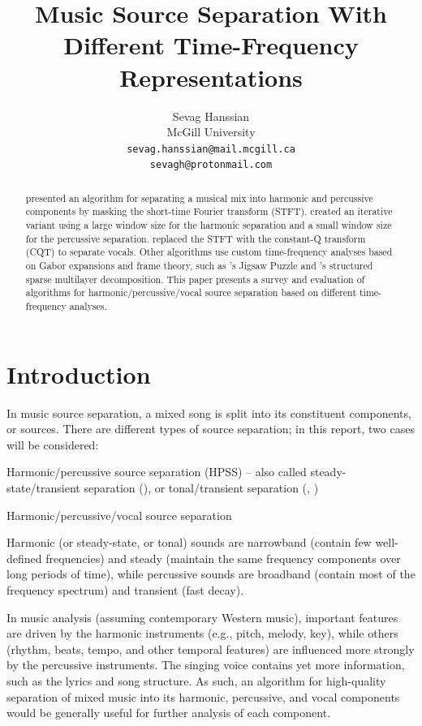 \documentclass[10pt,letter]{article}
\title{Music Source Separation With Different Time-Frequency Representations}
\author{Sevag Hanssian \\
  McGill University \\
 \texttt{sevag.hanssian@mail.mcgill.ca} \\
 \texttt{sevagh@protonmail.com}}
\date{}
\newenvironment{tight_enumerate}{
\begin{enumerate}
\setlength{\itemsep}{0pt}
\setlength{\parskip}{0pt}
}{\end{enumerate}}
\begin{document}
\maketitle

\begin{abstract}
	\citet{fitzgerald1} presented an algorithm for separating a musical mix into harmonic and percussive components by masking the short-time Fourier transform (STFT). \citet{driedger} created an iterative variant using a large window size for the harmonic separation and a small window size for the percussive separation. \citet{fitzgerald2} replaced the STFT with the constant-Q transform (CQT) to separate vocals. Other algorithms use custom time-frequency analyses based on Gabor expansions and frame theory, such as \citet{tfjigsaw}'s Jigsaw Puzzle and \citet{wmdct}'s structured sparse multilayer decomposition. This paper presents a survey and evaluation of algorithms for harmonic/percussive/vocal source separation based on different time-frequency analyses.
\end{abstract}

\section{Introduction}
\label{sec:intro}

In music source separation, a mixed song is split into its constituent components, or sources. There are different types of source separation; in this report, two cases will be considered:

\begin{tight_enumerate}
	\vspace{-0.5em}
	\item
		Harmonic/percussive source separation (HPSS) -- also called steady-state/transient separation (\cite{bayarres}), or tonal/transient separation (\cite{tfjigsaw}, \cite{wmdct})
	\item
		Harmonic/percussive/vocal source separation
\end{tight_enumerate}

Harmonic (or steady-state, or tonal) sounds are narrowband (contain few well-defined frequencies) and steady (maintain the same frequency components over long periods of time), while percussive sounds  are broadband (contain most of the frequency spectrum) and transient (fast decay).

In music analysis (assuming contemporary Western music), important features are driven by the harmonic instruments (e.g., pitch, melody, key), while others (rhythm, beats, tempo, and other temporal features) are influenced more strongly by the percussive instruments. The singing voice contains yet more information, such as the lyrics and song structure. As such, an algorithm for high-quality separation of mixed music into its harmonic, percussive, and vocal components would be generally useful for further analysis of each component.
\end{document}
